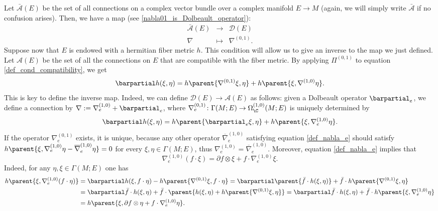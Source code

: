 Let \(\bar{\mathscr{A}}(E)\) be the set of all connections on a complex vector bundle over a complex manifold \(E \to M\) (again, we will simply write \(\bar{\mathscr{A}}\) if no confusion arises). Then, we have a map (see \eqref{nabla01_is_Dolbeault_operator}):
\[
\begin{array}{ccc}
    \bar{\mathscr{A}}(E) & \longrightarrow & \mathscr{D}(E) \\
    \nabla & \mapsto & \nabla^{(0,1)}.
\end{array}
\]
Suppose now that \(E\) is endowed with a hermitian fiber metric \(h\). This condition will allow us to give an inverse to the map we just defined. Let \(\mathscr{A}(E)\) be the set of all the connections on \(E\) that are compatible with the fiber metric. By applying \(\Pi^{(0,1)}\) to equation \ref{def_cond_compatibility}, we get
\[
\barpartial h(\xi, \eta) = h\parent{\nabla^{(0,1)}\xi, \eta} + h \parent{\xi, \nabla^{(1,0)}\eta}.
\]
This is key to define the inverse map. Indeed, we can define \(\mathscr{D}(E) \to \mathscr{A}(E)\) as follows: given a Dolbeault operator \( \barpartial_e\), we define a connection by \(\nabla:=\nabla^{(1,0)}_e + \barpartial_e\), where \(\nabla^{(0,1)}_e\colon \Gamma(M;E) \to \Omega_\C^{(1,0)}(M;E)\) is uniquely determined by
\begin{equation} \label{def_nabla_e}
\barpartial h(\xi, \eta) = h \parent{\barpartial_e \xi, \eta} + h\parent{\xi, \nabla^{(1,0)}_e \eta}.
\end{equation}
If the operator \(\nabla_e^{(0,1)}\) exists, it is unique, because any other operator \(\overline{\nabla}_e^{(1,0)}\) satisfying equation \eqref{def_nabla_e} should satisfy \(h\parent{\xi, \nabla_e^{(1,0)}\eta - \overline{\nabla}_e^{(1,0)}\eta}=0\) for every \(\xi, \eta \in \Gamma(M;E)\), thus \(\nabla_e^{(1,0)} =\overline{\nabla}_e^{(1,0)}\). Moreover, equation \eqref{def_nabla_e} implies that 
\begin{equation} \label{eq_ext_nabla01}
\nabla_e^{(1,0)} (f \cdot \xi) = \partial f \otimes \xi  + f \cdot \nabla_e^{(1,0)} \xi.
\end{equation}
Indeed, for any \(\eta, \xi \in \Gamma(M;E)\) one has
\begin{align*}
    h\parent{\xi, \nabla_e^{(1,0)} (f\cdot \eta)} & = \barpartial h(\xi, f\cdot \eta) - h\parent{\nabla^{(0,1)}\xi, f\cdot\eta} = \barpartial \parent{\bar{f}\cdot h(\xi, \eta)} + \bar{f}\cdot h\parent{\nabla^{(0,1)}\xi,\eta} \\
    & = \barpartial \bar{f} \cdot h(\xi, \eta) + \bar{f}\cdot \parent{h(\xi, \eta) + h\parent{\nabla^{(0,1)}\xi, \eta}} = \barpartial \bar{f} \cdot h(\xi, \eta) + \bar{f}\cdot h\parent{\xi, \nabla_e^{(1,0)}\eta} \\
    & = h\parent{\xi, \partial f \otimes \eta + f\cdot\nabla_e^{(1,0)}\eta}.
\end{align*}
